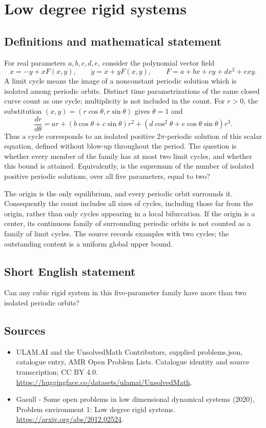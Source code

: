 \documentclass[11pt,a4paper]{article}
\begin{document}
\section*{Low degree rigid systems}\label{statement}

\subsection{Definitions and mathematical statement}
For real parameters $a,b,c,d,e$, consider the polynomial vector field
\[
 \dot x=-y+xF(x,y),\qquad \dot y=x+yF(x,y),\qquad
 F=a+bx+cy+dx^2+exy.
\]
A limit cycle means the image of a nonconstant periodic solution which is
isolated among periodic orbits. Distinct time parametrizations of the same
closed curve count as one cycle; multiplicity is not included in the count.
For $r>0$, the substitution $(x,y)=(r\cos\theta,r\sin\theta)$ gives
$\dot\theta=1$ and
\[
 \frac{dr}{d\theta}=ar+(b\cos\theta+c\sin\theta)r^2
 +(d\cos^2\theta+e\cos\theta\sin\theta)r^3.
\]
Thus a cycle corresponds to an isolated positive $2\pi$-periodic solution of
this scalar equation, defined without blow-up throughout the period.
The question is whether every member of the family has at most two limit
cycles, and whether this bound is attained. Equivalently, is the supremum of
the number of isolated positive periodic solutions, over all five parameters,
equal to two?

The origin is the only equilibrium, and every periodic orbit surrounds it.
Consequently the count includes all sizes of cycles, including those far from
the origin, rather than only cycles appearing in a local bifurcation. If the
origin is a center, its continuous family of surrounding periodic orbits is
not counted as a family of limit cycles. The source records examples with two
cycles; the outstanding content is a uniform global upper bound.
\subsection{Short English statement}
Can any cubic rigid system in this five-parameter family have more than two isolated periodic orbits?
\subsection{Sources}
\begin{itemize}
\item[S1] ULAM.AI and the UnsolvedMath Contributors, supplied problems.json, catalogue entry, AMR Open Problem Lists. Catalogue identity and source transcription; CC BY 4.0.
\url{https://huggingface.co/datasets/ulamai/UnsolvedMath}.
\item[S2] Gasull - Some open problems in low dimensional dynamical systems (2020), Problem environment 1: Low degree rigid systems. 
\url{https://arxiv.org/abs/2012.02524}.
\end{itemize}
\end{document}
